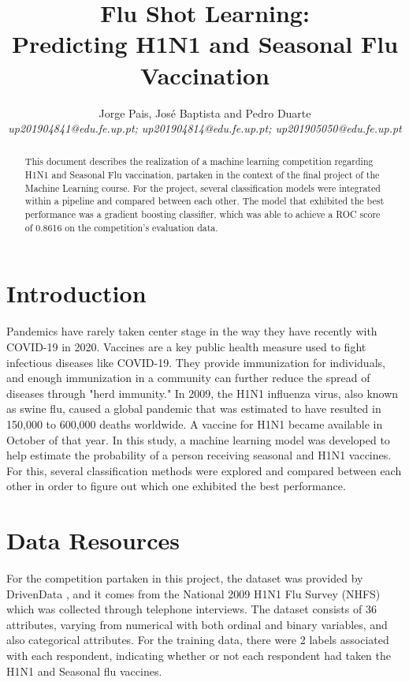 \documentclass{IEEEtran}
\begin{document}
\title{Flu Shot Learning: \\Predicting H1N1 and Seasonal Flu Vaccination}
\author{Jorge Pais, José Baptista and Pedro Duarte\\ 
    \textit{up201904841@edu.fe.up.pt; up201904814@edu.fe.up.pt; up201905050@edu.fe.up.pt}}

\maketitle

\begin{abstract}
    This document describes the realization of a machine learning competition regarding H1N1 and Seasonal Flu vaccination, partaken in the context of the final project of the Machine Learning course. For the project, several classification models were integrated within a pipeline and compared between each other. The model that exhibited the best performance was a gradient boosting classifier, which was able to achieve a ROC score of 0.8616 on the competition's evaluation data.
\end{abstract}

\section{Introduction}
Pandemics have rarely taken center stage in the way they have recently with COVID-19 in 2020.  Vaccines are a key public health measure used to fight infectious diseases like COVID-19. They provide immunization for individuals, and enough immunization in a community can further reduce the spread of diseases through "herd immunity." 
In 2009, the H1N1 influenza virus, also known as swine flu, caused a global pandemic that was estimated to have resulted in 150,000 to 600,000 deaths worldwide. A vaccine for H1N1 became available in October of that year. In this study, a machine learning model was developed to help estimate the probability of a person receiving seasonal and H1N1 vaccines. For this, several classification methods were explored and compared between each other in order to figure out which one exhibited the best performance.

\section{Data Resources}

For the competition partaken in this project, the dataset was provided by DrivenData \cite{b1}, and it comes from the National 2009 H1N1 Flu Survey (NHFS) which was collected through telephone interviews. The dataset consists of 36 attributes, varying from numerical with both ordinal and binary variables, and also categorical attributes. For the training data, there were 2 labels associated with each respondent, indicating whether or not each respondent had taken the H1N1 and Seasonal flu vaccines.
\end{document}
